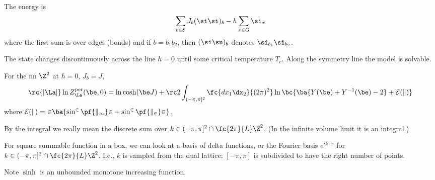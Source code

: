 

The energy is 
\[
\sum_{b\in \cal E}J_b (\si\si)_b - h\sum_{x\in G}\si_x
\] 
where the first sum is over edges (bonds) and if $b=b_1b_2$, then $(\si\su)_b$ denotes $\si_{b_1}\si_{b_2}$.

The state changes discontinuously across the line $h=0$ until some critical temperature $T_c$. Along the symmetry line the model is solvable.
\begin{thm}[Onsager]
For the nn $\Z^2$ at $h=0$, $J_b=J$, 
\[
\rc{|\La|} \ln Z_{\La}^{\text{per}} (\be, 0) = \ln \cosh (\be J)
+ \rc 2 \int_{(-\pi, \pi]^2} \fc{dx_1\dx_2}{(2\pi)^2}\ln \bc{
\ba{
Y(\be) + Y^{-1}(\be) - 2
} + \cal E(k)
}
\]
where $\cal E(k) = 2\ba{\sin^2 \pf{k_1}2 + \sin^2\pf{k_2}2}$.

By the integral we really mean the discrete sum over $k\in (-\pi,\pi]^2 \cap \fc{2\pi}{L}\Z^2$. (In the infinite volume limit it is an integral.)
\end{thm}
For square summable function in a box, we can look at a basis of delta functions, or the Fourier basis $e^{ik\cdot x}$ for $k\in (-\pi,\pi]^2 \cap \fc{2\pi}{L}\Z^2$. I.e., $k$ is sampled from the dual lattice; $[-\pi,\pi]$ is subdivided to have the right number of points.

Note $\sinh$ is an unbounded monotone increasing function. 

